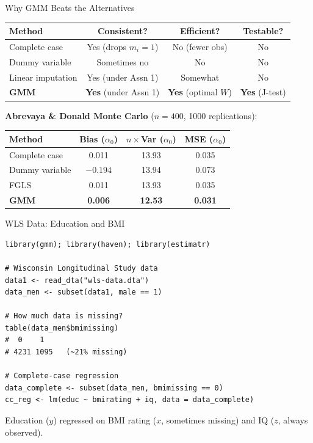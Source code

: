 \documentclass[aspectratio=169, handout, t]{beamer}
\numberwithin{equation}{section}
\begin{document}
\begin{frame}{Why GMM Beats the Alternatives}

\vspace{-4pt}
{\footnotesize
\begin{table}[h]
\centering
\begin{tabular}{lccc}
\toprule
\textbf{Method} & \textbf{Consistent?} & \textbf{Efficient?} & \textbf{Testable?} \\
\midrule
Complete case & Yes (drops $m_i\!=\!1$) & No (fewer obs) & No \\
Dummy variable & \alert{Sometimes no} & No & No \\
Linear imputation & Yes (under Assn 1) & Somewhat & No \\
\textbf{GMM} & \textbf{Yes} (under Assn 1) & \textbf{Yes} (optimal $W$) & \textbf{Yes} (J-test) \\
\bottomrule
\end{tabular}
\end{table}
}

\smallskip
\textbf{Abrevaya \& Donald Monte Carlo} ($n=400$, 1000 replications):

{\footnotesize
\begin{table}[h]
\centering
\begin{tabular}{lccc}
\toprule
\textbf{Method} & \textbf{Bias ($\alpha_0$)} & \textbf{$n \times$Var ($\alpha_0$)} & \textbf{MSE ($\alpha_0$)} \\
\midrule
Complete case & 0.011 & 13.93 & 0.035 \\
Dummy variable & $-0.194$ & 13.94 & 0.073 \\
FGLS & 0.011 & 13.93 & 0.035 \\
\textbf{GMM} & \textbf{0.006} & \textbf{12.53} & \textbf{0.031} \\
\bottomrule
\end{tabular}
\end{table}
}

\end{frame}

\begin{frame}[fragile]{WLS Data: Education and BMI}

\begin{lstlisting}[basicstyle=\ttfamily\scriptsize]
library(gmm); library(haven); library(estimatr)

# Wisconsin Longitudinal Study data
data1 <- read_dta("wls-data.dta")
data_men <- subset(data1, male == 1)

# How much data is missing?
table(data_men$bmimissing)
#  0    1
# 4231 1095   (~21% missing)

# Complete-case regression
data_complete <- subset(data_men, bmimissing == 0)
cc_reg <- lm(educ ~ bmirating + iq, data = data_complete)
\end{lstlisting}
Education ($y$) regressed on BMI rating ($x$, sometimes missing) and IQ ($z$, always observed).

\end{frame}
\end{document}
